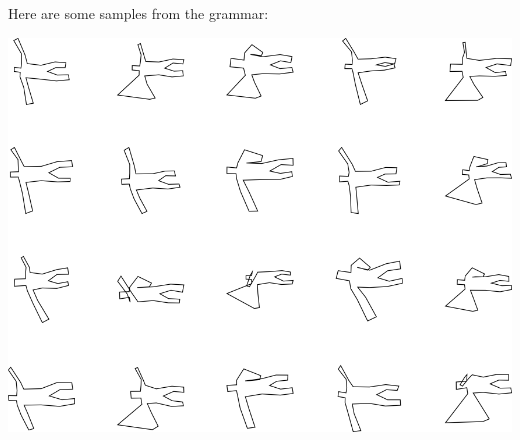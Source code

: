 Here are some samples from the grammar:

\includegraphics[width=6in]{output/3.learning/incremental/gram.11.d/samples.png}

